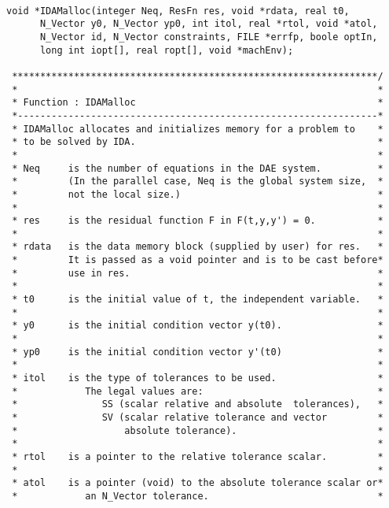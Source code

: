 \small
\begin{verbatim}

void *IDAMalloc(integer Neq, ResFn res, void *rdata, real t0,
      N_Vector y0, N_Vector yp0, int itol, real *rtol, void *atol, 
      N_Vector id, N_Vector constraints, FILE *errfp, boole optIn, 
      long int iopt[], real ropt[], void *machEnv);

 *****************************************************************/
 *                                                                *
 * Function : IDAMalloc                                           *
 *----------------------------------------------------------------*
 * IDAMalloc allocates and initializes memory for a problem to    *
 * to be solved by IDA.                                           *
 *                                                                *
 * Neq     is the number of equations in the DAE system.          *
 *         (In the parallel case, Neq is the global system size,  *
 *         not the local size.)                                   *
 *                                                                *
 * res     is the residual function F in F(t,y,y') = 0.           *          
 *                                                                *
 * rdata   is the data memory block (supplied by user) for res.   *
 *         It is passed as a void pointer and is to be cast before*
 *         use in res.                                            *
 *                                                                *
 * t0      is the initial value of t, the independent variable.   *
 *                                                                *
 * y0      is the initial condition vector y(t0).                 *
 *                                                                *
 * yp0     is the initial condition vector y'(t0)                 *
 *                                                                *
 * itol    is the type of tolerances to be used.                  *
 *            The legal values are:                               *
 *               SS (scalar relative and absolute  tolerances),   *
 *               SV (scalar relative tolerance and vector         *
 *                   absolute tolerance).                         *
 *                                                                *
 * rtol    is a pointer to the relative tolerance scalar.         *
 *                                                                *
 * atol    is a pointer (void) to the absolute tolerance scalar or*
 *            an N_Vector tolerance.                              *

\end{verbatim}
